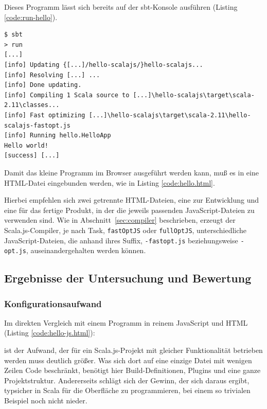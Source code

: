 \documentclass[a4paper, 12pt, hidelinks, listof=totoc, listoftables=totoc, bibliography=totoc]{scrreprt}
\begin{document}
Dieses Programm lässt sich bereits auf der sbt-Konsole ausführen (Listing \ref{code:run-hello}).

\begin{lstlisting}[caption={Lauf des Hallo-Welt-Programms in der sbt-REPL.}, label={code:run-hello}]
$ sbt
> run
[...]
[info] Updating {[...]/hello-scalajs/}hello-scalajs...
[info] Resolving [...] ...
[info] Done updating.
[info] Compiling 1 Scala source to [...]\hello-scalajs\target\scala-2.11\classes...
[info] Fast optimizing [...]\hello-scalajs\target\scala-2.11\hello-scalajs-fastopt.js
[info] Running hello.HelloApp
Hello world!
[success] [...]
\end{lstlisting}

Damit das kleine Programm im Browser ausgeführt werden kann, muß es in eine HTML-Datei eingebunden werden, wie in Listing \ref{code:hello.html}.



Hierbei empfehlen sich zwei getrennte HTML-Dateien, eine zur Entwicklung und eine für das fertige Produkt, in der die jeweils passenden JavaScript-Dateien zu verwenden sind. Wie in Abschnitt~\ref{sec:compiler} beschrieben, erzeugt der Scala.js-Compiler, je nach Task, \texttt{fastOptJS} oder \texttt{fullOptJS}, unterschiedliche JavaScript-Dateien, die anhand ihres Suffix, \texttt{-fastopt.js} beziehungsweise \texttt{-opt.js}, auseinandergehalten werden können.

\subsection{Ergebnisse der Untersuchung und Bewertung}

\subsubsection{Konfigurationsaufwand}

Im direkten Vergleich mit einem Programm in reinem JavaScript und HTML (Listing \ref{code:hello-js.html}):



ist der Aufwand, der für ein Scala.js-Projekt mit gleicher Funktionalität betrieben werden muss deutlich größer. Was sich dort auf eine einzige Datei mit wenigen Zeilen Code beschränkt, benötigt hier Build-Definitionen, Plugins und eine ganze Projektstruktur. Andererseits schlägt sich der Gewinn, der sich daraus ergibt, typsicher in Scala für die Oberfläche zu programmieren, bei einem so trivialen Beispiel noch nicht nieder.
\end{document}
